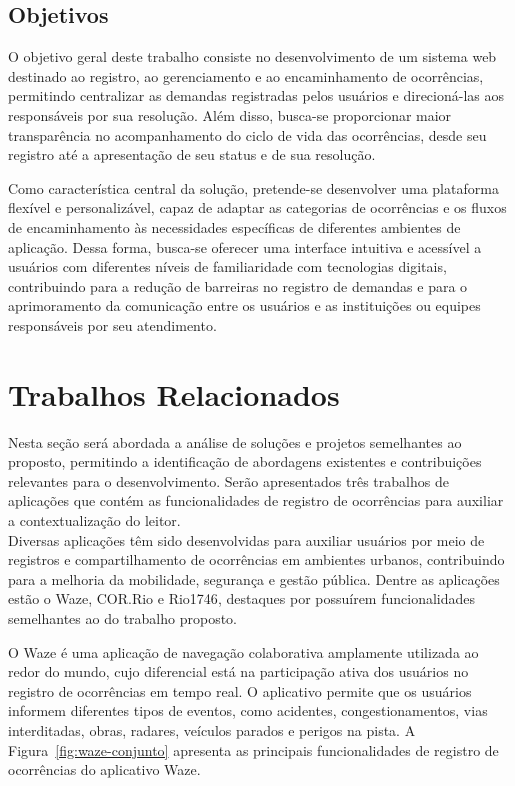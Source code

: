 \documentclass[12pt,a4paper]{article}
\begin{document}
\subsection{Objetivos}
O objetivo geral deste trabalho consiste no desenvolvimento de um sistema web destinado ao registro, ao gerenciamento e ao encaminhamento de ocorrências, permitindo centralizar as demandas registradas pelos usuários e direcioná-las aos responsáveis por sua resolução. Além disso, busca-se proporcionar maior transparência no acompanhamento do ciclo de vida das ocorrências, desde seu registro até a apresentação de seu status e de sua resolução.

Como característica central da solução, pretende-se desenvolver uma plataforma flexível e personalizável, capaz de adaptar as categorias de ocorrências e os fluxos de encaminhamento às necessidades específicas de diferentes ambientes de aplicação. Dessa forma, busca-se oferecer uma interface intuitiva e acessível a usuários com diferentes níveis de familiaridade com tecnologias digitais, contribuindo para a redução de barreiras no registro de demandas e para o aprimoramento da comunicação entre os usuários e as instituições ou equipes responsáveis por seu atendimento.
\clearpage

\section{Trabalhos Relacionados}
Nesta seção será abordada a análise de soluções e projetos semelhantes ao proposto, permitindo a identificação de abordagens existentes e contribuições relevantes para o desenvolvimento. Serão apresentados três trabalhos de aplicações que contém as funcionalidades de registro de ocorrências para auxiliar a contextualização do leitor. \\

Diversas aplicações têm sido desenvolvidas para auxiliar usuários por meio de registros e compartilhamento de ocorrências em ambientes urbanos, contribuindo para a melhoria da mobilidade, segurança e gestão pública. Dentre as aplicações estão o Waze\cite{waze}, COR.Rio\cite{cor-rio} e Rio1746\cite{1746}, destaques por possuírem funcionalidades semelhantes ao do trabalho proposto.

O Waze é uma aplicação de navegação colaborativa amplamente utilizada ao redor do mundo, cujo diferencial está na participação ativa dos usuários no registro de ocorrências em tempo real. O aplicativo permite que os usuários informem diferentes tipos de eventos, como acidentes, congestionamentos, vias interditadas, obras, radares, veículos parados e perigos na pista. A Figura~\ref{fig:waze-conjunto} apresenta as principais funcionalidades de
registro de ocorrências do aplicativo Waze.
\end{document}
